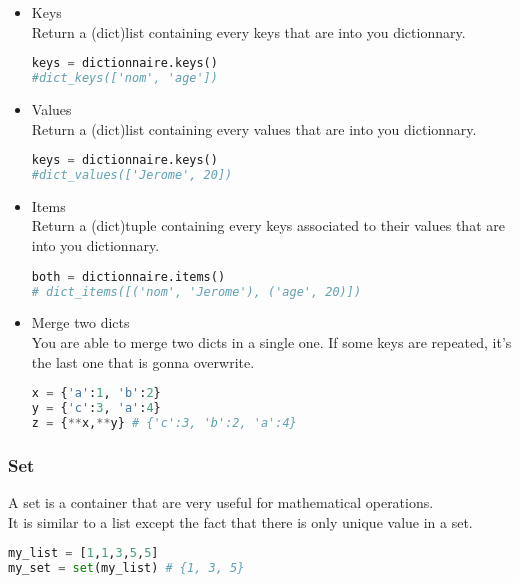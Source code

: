 \documentclass[a4paper, 12pt, titlepage]{scrartcl} %
\begin{document}
\begin{itemize}
\item Keys \\
Return a (dict)list containing every keys that are into you dictionnary.
\begin{lstlisting}[language=Python]
keys = dictionnaire.keys()
#dict_keys(['nom', 'age'])
\end{lstlisting} \vspace{5mm}

\item Values \\
Return a (dict)list containing every values that are into you dictionnary.
\begin{lstlisting}[language=Python]
keys = dictionnaire.keys()
#dict_values(['Jerome', 20])
\end{lstlisting} \vspace{5mm}

\item Items \\
Return a (dict)tuple containing every keys associated to their values that are into you dictionnary.
\begin{lstlisting}[language=Python]
both = dictionnaire.items()
# dict_items([('nom', 'Jerome'), ('age', 20)])
\end{lstlisting} \vspace{5mm}
\item Merge two dicts \\
You are able to merge two dicts in a single one. If some keys are repeated, it's the last one that is gonna overwrite.
\begin{lstlisting}[language=Python]
x = {'a':1, 'b':2}
y = {'c':3, 'a':4}
z = {**x,**y} # {'c':3, 'b':2, 'a':4}
\end{lstlisting} \vspace{5mm}
\end{itemize}


\subsubsection{Set}
A set is a container that are very useful for mathematical operations.\\
It is similar to a list except the fact that there is only unique value in a set.
\begin{lstlisting}[language=Python]
my_list = [1,1,3,5,5]
my_set = set(my_list) # {1, 3, 5}
\end{lstlisting} \vspace{5mm}
\end{document}

